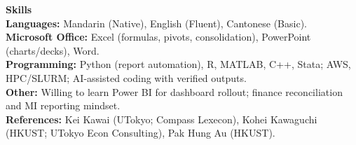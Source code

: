 \documentclass[11pt,letterpaper]{article}
\begin{document}
\vspace{0.15pt}

{\large \textbf{Skills}}\\[-0.5pt]
\textbf{Languages:} Mandarin (Native), English (Fluent), Cantonese (Basic).\\
\textbf{Microsoft Office:} Excel (formulas, pivots, consolidation), PowerPoint (charts/decks), Word.\\
\textbf{Programming:} Python (report automation), R, MATLAB, C++, Stata; AWS, HPC/SLURM; AI-assisted coding with verified outputs.\\
\textbf{Other:} Willing to learn Power BI for dashboard rollout; finance reconciliation and MI reporting mindset.\\
\textbf{References:} Kei Kawai (UTokyo; Compass Lexecon), Kohei Kawaguchi (HKUST; UTokyo Econ Consulting), Pak Hung Au (HKUST).
\end{document}

